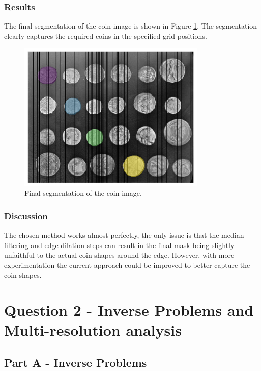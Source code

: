 \documentclass[11pt]{article}
\begin{document}
\subsubsection{Results}
The final segmentation of the coin image is shown in Figure \ref{fig:q1c_selected_coins}. The segmentation clearly captures the required coins in the specified grid positions.  

\begin{figure}[H]
    \centering
    \includegraphics[width=0.8\textwidth]{figs/q1c.png}
    \caption{Final segmentation of the coin image.}
    \label{fig:q1c_selected_coins}
\end{figure}

\subsubsection{Discussion}
The chosen method works almost perfectly, the only issue is that the median filtering and edge dilation steps can result in the final mask being slightly unfaithful to the actual coin shapes around the edge. However, with more experimentation the current approach could be improved to better capture the coin shapes.

\section{Question 2 - Inverse Problems and Multi-resolution analysis}
\subsection{Part A - Inverse Problems}
\end{document}
